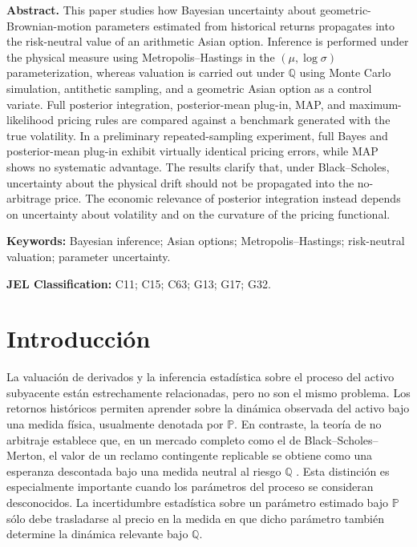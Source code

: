 \documentclass[12pt,letterpaper]{article}
\newcommand{\Pmeasure}{\mathbb{P}}
\newcommand{\Qmeasure}{\mathbb{Q}}
\begin{document}
\textbf{Abstract.} This paper studies how Bayesian uncertainty about geometric-Brownian-motion parameters estimated from historical returns propagates into the risk-neutral value of an arithmetic Asian option. Inference is performed under the physical measure using Metropolis--Hastings in the $(\mu,\log\sigma)$ parameterization, whereas valuation is carried out under $\mathbb Q$ using Monte Carlo simulation, antithetic sampling, and a geometric Asian option as a control variate. Full posterior integration, posterior-mean plug-in, MAP, and maximum-likelihood pricing rules are compared against a benchmark generated with the true volatility. In a preliminary repeated-sampling experiment, full Bayes and posterior-mean plug-in exhibit virtually identical pricing errors, while MAP shows no systematic advantage. The results clarify that, under Black--Scholes, uncertainty about the physical drift should not be propagated into the no-arbitrage price. The economic relevance of posterior integration instead depends on uncertainty about volatility and on the curvature of the pricing functional.

\textbf{Keywords:} Bayesian inference; Asian options; Metropolis--Hastings; risk-neutral valuation; parameter uncertainty.

\textbf{JEL Classification:} C11; C15; C63; G13; G17; G32.


\section{Introducción}

La valuación de derivados y la inferencia estadística sobre el proceso del activo subyacente están estrechamente relacionadas, pero no son el mismo problema. Los retornos históricos permiten aprender sobre la dinámica observada del activo bajo una medida física, usualmente denotada por $\Pmeasure$. En contraste, la teoría de no arbitraje establece que, en un mercado completo como el de Black--Scholes--Merton, el valor de un reclamo contingente replicable se obtiene como una esperanza descontada bajo una medida neutral al riesgo $\Qmeasure$ \citep{blackscholes1973,merton1973}. Esta distinción es especialmente importante cuando los parámetros del proceso se consideran desconocidos. La incertidumbre estadística sobre un parámetro estimado bajo $\Pmeasure$ sólo debe trasladarse al precio en la medida en que dicho parámetro también determine la dinámica relevante bajo $\Qmeasure$.
\end{document}
